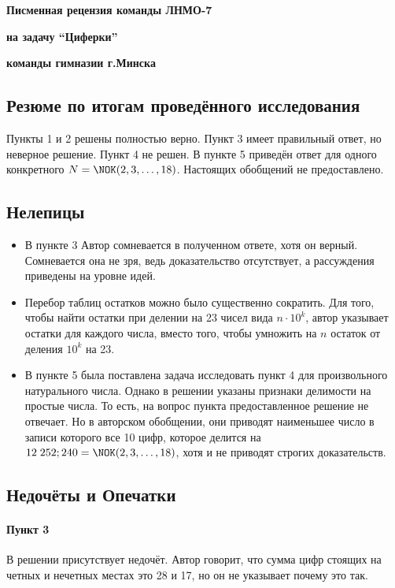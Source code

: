\documentclass[12pt,twoside]{article}
\begin{document}
\centerline{\bf\large Писменная рецензия команды ЛНМО-7}	
\centerline{\bf\large на задачу ``Циферки''}
\centerline{\bf\large команды гимназии  г.Минска}
\vspace{12pt}

\subsection*{Резюме по итогам проведённого исследования}
\noindent Пункты 1 и 2 решены полностью верно. Пункт 3 имеет правильный ответ, но неверное решение. Пункт 4 не решен. В пункте 5 приведён ответ для одного конкретного \linebreak $N=\NOK(2,3,\ldots,18)$. Настоящих обобщений не предоставлено.
	
\subsection*{Нелепицы}
\begin{itemize}
\item В пункте 3 Автор сомневается в полученном ответе, хотя он верный. Сомневается она не зря, ведь доказательство отсутствует, а рассуждения приведены на уровне идей.
	
\item Перебор таблиц остатков можно было существенно сократить. Для того, чтобы найти остатки при делении на 23 чисел вида $n\cdot10^k$, автор указывает остатки для каждого числа, вместо того, чтобы умножить на $n$ остаток от деления $10^k$ на 23.

\item В пункте 5 была поставлена задача исследовать пункт 4 для произвольного натурального числа. Однако в решении указаны признаки делимости на простые числа. То есть, на вопрос пункта предоставленное решение не отвечает. Но в авторском обобщении, они приводят наименьшее число в записи которого все 10 цифр, которое делится на $12\;252;240=\NOK(2,3,\ldots,18)$, хотя и не приводят строгих доказательств.
\end{itemize}

\subsection*{Недочёты и Опечатки}
\paragraph{Пункт 3} В решении присутствует недочёт. Автор говорит, что сумма цифр стоящих на четных и нечетных местах это 28 и 17, но он не указывает почему это так.
\end{document}

